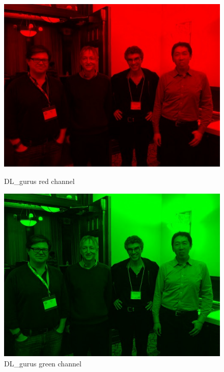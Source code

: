 \begin{figure}[h]
	\centering
	\begin{minipage}{0.45\textwidth}
		\centering
		\includegraphics[width=\linewidth]{images/source/task4/3/1}
		\caption{DL\_gurus red channel}
		\label{fig:1a}
        \end{minipage}
        \hspace{0.05\textwidth}
        \begin{minipage}{0.45\textwidth}
        		\centering
		\includegraphics[width=\linewidth]{images/source/task4/3/2}
		\caption{DL\_gurus green channel}
		\label{fig:1b}
        \end{minipage}
        \hspace{0.05\textwidth}

\end{figure}
